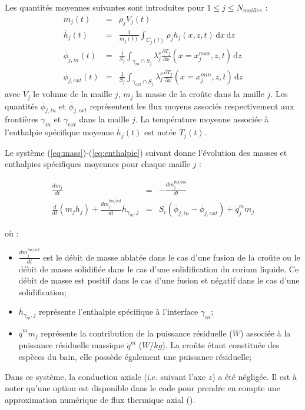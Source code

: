 Les quantités moyennes suivantes sont introduites pour $1 \leq j\leq N_{mailles}$ :
\begin{eqnarray}
m_{j}(t) &=& \rho_j  V_j(t) \\
\overline{h}_j(t) &=& \frac{1}{m_j(t)} \int_{C_j(t)} \rho_j h_j(x,z,t)\,\mathrm{d}x\, \mathrm{d}z\\
\overline{\phi}_{j,in}(t) &=& \frac{1}{S_j}\int_{\gamma_{in}\cap S_j}\lambda_j^s \frac{\partial T_{j}}{\partial x}(x=x_j^{max},z,t)\, \mathrm{d}z  \label{eq:phi_j_in}\\
\overline{\phi}_{j,ext}(t) &=& \frac{1}{S_j}\int_{\gamma_{ext}\cap S_j}\lambda_j^s \frac{\partial T_{j}}{\partial x} (x=x_j^{min},z,t)\, \mathrm{d}z  \label{eq:phi_j_ext}
\end{eqnarray}
avec $V_j$ le volume de la maille $j$, $m_{j}$ la masse de la croûte dans la maille $j$. Les quantités $\overline{\phi}_{j,in}$ et $\overline{\phi}_{j,ext}$ représentent les flux moyens associés respectivement aux frontières $\gamma_{in}$ et $\gamma_{ext}$ dans la maille $j$. La température moyenne associée à l'enthalpie spécifique moyenne $\overline{h}_j(t)$ est notée $\overline{T}_{j}(t)$.


Le système (\ref{eq:mass})-(\ref{eq:enthalpie}) suivant donne l'évolution des masses et enthalpies spécifiques moyennes pour chaque maille $j$ :

\begin{eqnarray}
\frac{dm_{j}}{dt} &=& - \frac{dm_{j}^\text{fus/sol}}{dt} \label{eq:mass} \\ 
 \frac{d}{dt}(m_{j}\overline{h}_{j}) + \frac{dm_{j}^\text{fus/sol}}{dt} \overline{h}_{\gamma_{in},j} & = & S_i\left(\overline{\phi}_{j,in} - \overline{\phi}_{j,ext}\right) + \dot{q}_j^m m_{j} \label{eq:enthalpie}
\end{eqnarray}

où :

\begin{itemize}
 \item $\frac{dm_j^\text{fus/sol}}{dt}$ est le débit de masse ablatée dans le cas d'une fusion de la croûte ou le débit de masse solidifiée dans le cas d'une solidification du corium liquide. Ce débit de masse est positif dans le cas d'une fusion et négatif dans le cas d'une solidification;
 \item $\overline{h}_{\gamma_{in},j}$ représente l'enthalpie spécifique à l’interface $\gamma_{in}$;
 \item $\dot{q}^m m_j$ représente la contribution de la puissance résiduelle ($W$) associée à la puissance résiduelle massique $\dot{q}^m$ ($W/kg$). La croûte étant constituée des espèces du bain, elle possède également une puissance résiduelle;
\end{itemize}
Dans ce système, la conduction axiale (i.e. suivant l'axe $z$) a été négligée. Il est à noter qu'une option est disponible dans le code pour prendre en compte une approximation numérique de flux thermique axial (\cite{Peybernes2018}). 

